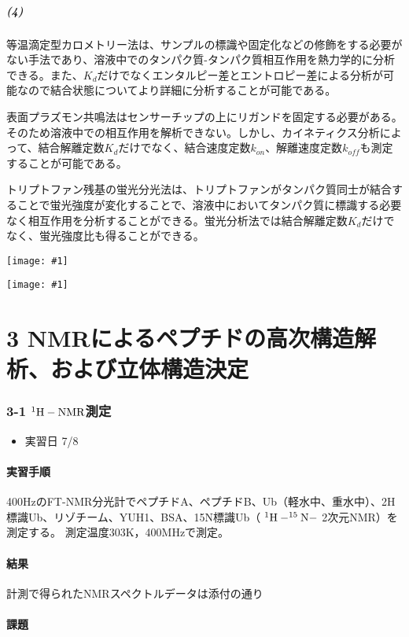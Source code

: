 \documentclass[a4paper,papersize,dvipdfmx]{jsarticle}
\newcommand{\pic}[1]{\begin{center} \texttt{[image: \#1]} \end{center}}   %
\begin{document}
\subsubsection*{(4)}
等温滴定型カロメトリー法は、サンプルの標識や固定化などの修飾をする必要がない手法であり、溶液中でのタンパク質-タンパク質相互作用を熱力学的に分析できる。また、$K_d$だけでなくエンタルピー差とエントロピー差による分析が可能なので結合状態についてより詳細に分析することが可能である。

表面プラズモン共鳴法はセンサーチップの上にリガンドを固定する必要がある。そのため溶液中での相互作用を解析できない。しかし、カイネティクス分析によって、結合解離定数$K_d$だけでなく、結合速度定数$k_{on}$、解離速度定数$k_{off}$も測定することが可能である。

トリプトファン残基の蛍光分光法は、トリプトファンがタンパク質同士が結合することで蛍光強度が変化することで、溶液中においてタンパク質に標識する必要なく相互作用を分析することができる。蛍光分析法では結合解離定数$K_d$だけでなく、蛍光強度比も得ることができる。

\pic{imgs/bk-xg1.png}
\pic{imgs/bk-xg2.png}

\newpage

\part*{3 NMRによるペプチドの高次構造解析、および立体構造決定}

\section*{3-1 $\rm ^1 H-NMR$測定}

\begin{itemize}
\item 実習日 7/8
\end{itemize}

\subsection*{実習手順}
400HzのFT-NMR分光計でペプチドA、ペプチドB、Ub（軽水中、重水中）、2H標識Ub、リゾチーム、YUH1、BSA、15N標識Ub（ $\rm ^1H-^{15}N-$ 2次元NMR）を測定する。
測定温度303K，400MHzで測定。


\subsection*{結果}
計測で得られたNMRスペクトルデータは添付の通り

\subsection*{課題}
\end{document}
